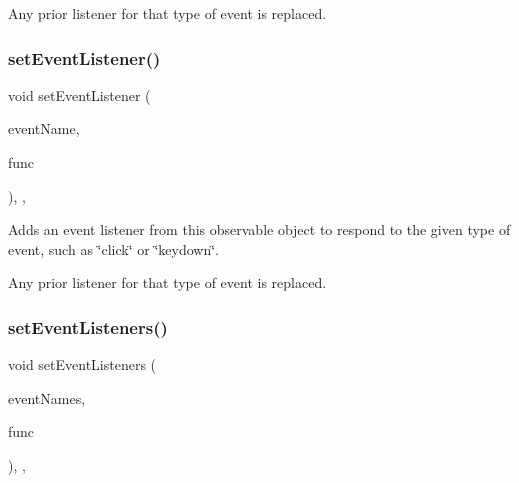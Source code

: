 Any prior listener for that type of event is replaced. \mbox{\label{classGObservable_abac4cb9f9e626e010e87f5d91573c8a5}} 
\subsubsection{\texorpdfstring{set\+Event\+Listener()}{setEventListener()}\hspace{0.1cm}{\footnotesize\ttfamily [2/2]}}
{\footnotesize\ttfamily void set\+Event\+Listener (\begin{DoxyParamCaption}\item[{const std\+::string \&}]{event\+Name,  }\item[{G\+Event\+Listener\+Void}]{func }\end{DoxyParamCaption})\hspace{0.3cm}{\ttfamily [protected]}, {\ttfamily [virtual]}, {\ttfamily [inherited]}}



Adds an event listener from this observable object to respond to the given type of event, such as \char`\"{}click\char`\"{} or \char`\"{}keydown\char`\"{}. 

Any prior listener for that type of event is replaced. \mbox{\label{classGObservable_afa388d69c33c718cf035774604065604}} 
\subsubsection{\texorpdfstring{set\+Event\+Listeners()}{setEventListeners()}\hspace{0.1cm}{\footnotesize\ttfamily [1/2]}}
{\footnotesize\ttfamily void set\+Event\+Listeners (\begin{DoxyParamCaption}\item[{std\+::initializer\+\_\+list$<$ std\+::string $>$}]{event\+Names,  }\item[{G\+Event\+Listener}]{func }\end{DoxyParamCaption})\hspace{0.3cm}{\ttfamily [protected]}, {\ttfamily [virtual]}, {\ttfamily [inherited]}}




